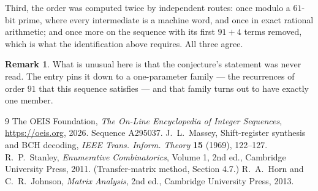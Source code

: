 \documentclass[11pt,a4paper]{article}
\theoremstyle{plain}
\theoremstyle{definition}
\newtheorem{remark}[theorem]{Remark}
\begin{document}
Third, the order was computed twice by independent routes: once modulo a $61$-bit prime, where
every intermediate is a machine word, and once in exact rational arithmetic; and once more on
the sequence with its first $91+4$ terms removed, which is what the identification above
requires. All three agree.

\begin{remark}
What is unusual here is that the conjecture's statement was never read. The entry pins it down
to a one-parameter family --- the recurrences of order $91$ that this sequence satisfies
--- and that family turns out to have exactly one member.
\end{remark}

\begin{thebibliography}{9}
 The OEIS Foundation, \emph{The On-Line Encyclopedia of Integer
Sequences}, \url{https://oeis.org}, 2026. Sequence A295037.
 J.~L.~Massey, Shift-register synthesis and BCH decoding, \emph{IEEE
Trans. Inform. Theory} \textbf{15} (1969), 122--127.
 R.~P.~Stanley, \emph{Enumerative Combinatorics}, Volume 1, 2nd ed.,
Cambridge University Press, 2011. (Transfer-matrix method, Section 4.7.)
 R.~A.~Horn and C.~R.~Johnson, \emph{Matrix Analysis}, 2nd ed., Cambridge
University Press, 2013.
\end{thebibliography}
\end{document}
